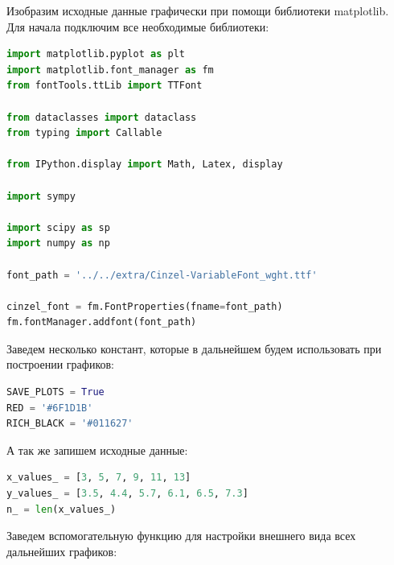\documentclass[a4paper, 14pt]{extarticle}
\begin{document}
Изобразим исходные данные графически при помощи библиотеки matplotlib. \\
Для начала подключим все необходимые библиотеки:

\begin{center}
    \begin{lstlisting}[language=Python]
import matplotlib.pyplot as plt
import matplotlib.font_manager as fm
from fontTools.ttLib import TTFont

from dataclasses import dataclass
from typing import Callable

from IPython.display import Math, Latex, display

import sympy

import scipy as sp
import numpy as np

font_path = '../../extra/Cinzel-VariableFont_wght.ttf'

cinzel_font = fm.FontProperties(fname=font_path)
fm.fontManager.addfont(font_path)
    \end{lstlisting}
\end{center}

Заведем несколько констант, которые в дальнейшем будем использовать при построении графиков:

\begin{center}
    \begin{lstlisting}[language=Python]
SAVE_PLOTS = True
RED = '#6F1D1B'
RICH_BLACK = '#011627'
    \end{lstlisting}
\end{center}

А так же запишем исходные данные:

\begin{center}
    \begin{lstlisting}[language=Python]
x_values_ = [3, 5, 7, 9, 11, 13]
y_values_ = [3.5, 4.4, 5.7, 6.1, 6.5, 7.3]
n_ = len(x_values_)
    \end{lstlisting}
\end{center}

Заведем вспомогательную функцию для настройки внешнего вида всех дальнейших графиков:
\end{document}
